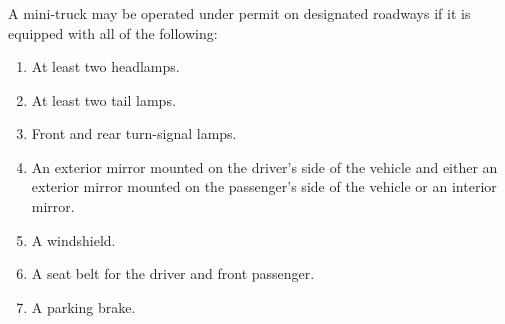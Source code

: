 \subsubsection{}
A mini-truck may be operated under permit on designated roadways if it is equipped with all of the following:
\begin{enumerate}[{\indent}a)]
    \item At least two headlamps.
    \item At least two tail lamps.
    \item Front and rear turn-signal lamps.
    \item An exterior mirror mounted on the driver’s side of the vehicle and either an exterior mirror mounted on the passenger’s side of the vehicle or an interior mirror.
    \item A windshield.
    \item A seat belt for the driver and front passenger.
    \item A parking brake.
\end{enumerate}

